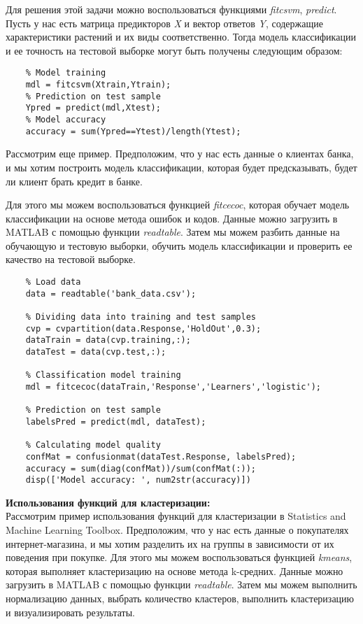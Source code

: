 \documentclass[a4paper, 12pt]{article}%
\begin{document}
\begin{titlepage}
	Для решения этой задачи можно воспользоваться функциями \textit{fitcsvm}, \textit{predict}. Пусть у нас есть матрица предикторов \textit{X} и вектор ответов \textit{Y}, содержащие характеристики растений и их виды соответственно. Тогда модель классификации и ее точность на тестовой выборке могут быть получены следующим образом:\\
	
	
	\begin{lstlisting}
	% Model training
	mdl = fitcsvm(Xtrain,Ytrain); 
	% Prediction on test sample
	Ypred = predict(mdl,Xtest); 
	% Model accuracy
	accuracy = sum(Ypred==Ytest)/length(Ytest); 
	\end{lstlisting}
	
	Рассмотрим еще пример. Предположим, что у нас есть данные о клиентах банка, и мы хотим построить модель классификации, которая будет предсказывать, будет ли клиент брать кредит в банке.
	
	Для этого мы можем воспользоваться функцией \textit{fitcecoc}, которая обучает модель классификации на основе метода ошибок и кодов. Данные можно загрузить в MATLAB с помощью функции \textit{readtable}. Затем мы можем разбить данные на обучающую и тестовую выборки, обучить модель классификации и проверить ее качество на тестовой выборке.\\
	
	
	\begin{lstlisting}
	% Load data
	data = readtable('bank_data.csv');
	
	% Dividing data into training and test samples
	cvp = cvpartition(data.Response,'HoldOut',0.3);
	dataTrain = data(cvp.training,:);
	dataTest = data(cvp.test,:);
	
	% Classification model training
	mdl = fitcecoc(dataTrain,'Response','Learners','logistic');
	
	% Prediction on test sample
	labelsPred = predict(mdl, dataTest);
	
	% Calculating model quality
	confMat = confusionmat(dataTest.Response, labelsPred);
	accuracy = sum(diag(confMat))/sum(confMat(:));
	disp(['Model accuracy: ', num2str(accuracy)])
	\end{lstlisting}
	
	
	\textbf{Использования функций для кластеризации:}\\
	Рассмотрим пример использования функций для кластеризации в Statistics and Machine Learning Toolbox. Предположим, что у нас есть данные о покупателях интернет-магазина, и мы хотим разделить их на группы в зависимости от их поведения при покупке.
	Для этого мы можем воспользоваться функцией \textit{kmeans}, которая выполняет кластеризацию на основе метода k-средних. Данные можно загрузить в MATLAB с помощью функции \textit{readtable}. Затем мы можем выполнить нормализацию данных, выбрать количество кластеров, выполнить кластеризацию и визуализировать результаты.\\
	

\end{titlepage}
\end{document}
